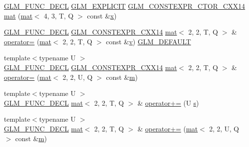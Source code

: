 \begin{DoxyCompactItemize}
\item 
\hyperlink{setup_8hpp_ab2d052de21a70539923e9bcbf6e83a51}{G\+L\+M\+\_\+\+F\+U\+N\+C\+\_\+\+D\+E\+CL} \hyperlink{setup_8hpp_a6c74f5a5e7b134ab69023ff9a30d4d5d}{G\+L\+M\+\_\+\+E\+X\+P\+L\+I\+C\+IT} \hyperlink{setup_8hpp_a0900f9145e68bf6061b6f5e7be3fa751}{G\+L\+M\+\_\+\+C\+O\+N\+S\+T\+E\+X\+P\+R\+\_\+\+C\+T\+O\+R\+\_\+\+C\+X\+X14} \hyperlink{structglm_1_1mat_3_012_00_012_00_01_t_00_01_q_01_4_aece09f8eb654228f28ed992288a3919a}{mat} (\hyperlink{structglm_1_1mat}{mat}$<$ 4, 3, T, Q $>$ const \&\hyperlink{_s_d_l__opengl_8h_ad0e63d0edcdbd3d79554076bf309fd47}{x})
\item 
\hyperlink{setup_8hpp_ab2d052de21a70539923e9bcbf6e83a51}{G\+L\+M\+\_\+\+F\+U\+N\+C\+\_\+\+D\+E\+CL} \hyperlink{setup_8hpp_a4dd12abf5e1164bc57f3a34671d03844}{G\+L\+M\+\_\+\+C\+O\+N\+S\+T\+E\+X\+P\+R\+\_\+\+C\+X\+X14} \hyperlink{structglm_1_1mat}{mat}$<$ 2, 2, T, Q $>$ \& \hyperlink{structglm_1_1mat_3_012_00_012_00_01_t_00_01_q_01_4_a8ee5f3e6cd86052e0ac2119f3ef52358}{operator=} (\hyperlink{structglm_1_1mat}{mat}$<$ 2, 2, T, Q $>$ const \&\hyperlink{_s_d_l__opengl_8h_a10a82eabcb59d2fcd74acee063775f90}{v}) \hyperlink{setup_8hpp_aefce7051c376a64ba89fa93a9f63bc2c}{G\+L\+M\+\_\+\+D\+E\+F\+A\+U\+LT}
\item 
{\footnotesize template$<$typename U $>$ }\\\hyperlink{setup_8hpp_ab2d052de21a70539923e9bcbf6e83a51}{G\+L\+M\+\_\+\+F\+U\+N\+C\+\_\+\+D\+E\+CL} \hyperlink{setup_8hpp_a4dd12abf5e1164bc57f3a34671d03844}{G\+L\+M\+\_\+\+C\+O\+N\+S\+T\+E\+X\+P\+R\+\_\+\+C\+X\+X14} \hyperlink{structglm_1_1mat}{mat}$<$ 2, 2, T, Q $>$ \& \hyperlink{structglm_1_1mat_3_012_00_012_00_01_t_00_01_q_01_4_a5b25b3f234873c4246a76fa03f7c83ef}{operator=} (\hyperlink{structglm_1_1mat}{mat}$<$ 2, 2, U, Q $>$ const \&\hyperlink{_s_d_l__opengl__glext_8h_af593500c283bf1a787a6f947f503a5c2}{m})
\item 
{\footnotesize template$<$typename U $>$ }\\\hyperlink{setup_8hpp_ab2d052de21a70539923e9bcbf6e83a51}{G\+L\+M\+\_\+\+F\+U\+N\+C\+\_\+\+D\+E\+CL} \hyperlink{structglm_1_1mat}{mat}$<$ 2, 2, T, Q $>$ \& \hyperlink{structglm_1_1mat_3_012_00_012_00_01_t_00_01_q_01_4_acb56f312f0c6017e051b447d4bdaf2e1}{operator+=} (U \hyperlink{_s_d_l__opengl_8h_a4af680a6c683f88ed67b76f207f2e6e4}{s})
\item 
{\footnotesize template$<$typename U $>$ }\\\hyperlink{setup_8hpp_ab2d052de21a70539923e9bcbf6e83a51}{G\+L\+M\+\_\+\+F\+U\+N\+C\+\_\+\+D\+E\+CL} \hyperlink{structglm_1_1mat}{mat}$<$ 2, 2, T, Q $>$ \& \hyperlink{structglm_1_1mat_3_012_00_012_00_01_t_00_01_q_01_4_a790cb47974031acf26e1f76c1453da8b}{operator+=} (\hyperlink{structglm_1_1mat}{mat}$<$ 2, 2, U, Q $>$ const \&\hyperlink{_s_d_l__opengl__glext_8h_af593500c283bf1a787a6f947f503a5c2}{m})

\end{DoxyCompactItemize}
